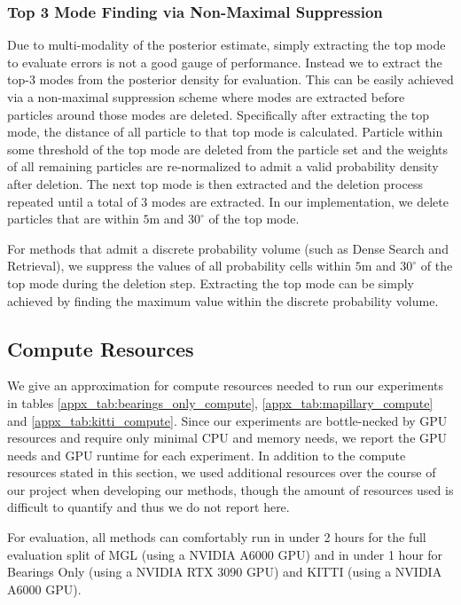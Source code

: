     \subsubsection{Top 3 Mode Finding via Non-Maximal Suppression}
        Due to multi-modality of the posterior estimate, simply extracting the top mode to evaluate errors is not a good gauge of performance.  Instead we  to extract the top-3 modes from the posterior density for evaluation.  This can be easily achieved via a non-maximal suppression scheme where modes are extracted before particles around those modes are deleted.
        Specifically after extracting the top mode, the distance of all particle to that top mode is calculated. Particle within some threshold of the top mode are deleted from the particle set and the weights of all remaining particles are re-normalized to admit a valid probability density after deletion.  The next top mode is then extracted and the deletion process repeated until a total of 3 modes are extracted. In our implementation, we delete particles that are within $5$m and $30^{\circ}$ of the top mode. 
        
        For methods that admit a discrete probability volume (such as Dense Search and Retrieval), we suppress the values of all probability cells  within $5$m and $30^{\circ}$ of the top mode during the deletion step.  Extracting the top mode can be simply achieved by finding the maximum value within the discrete probability volume.



\subsection{Compute Resources}

    We give an approximation for compute resources needed to run our experiments in tables \ref{appx_tab:bearings_only_compute}, \ref{appx_tab:mapillary_compute} and \ref{appx_tab:kitti_compute}. Since our experiments are bottle-necked by GPU resources and require only minimal CPU and memory needs, we report the GPU needs and GPU runtime for each experiment. In addition to the compute resources stated in this section, we used additional resources over the course of our project when developing our methods, though the amount of resources used is difficult to quantify and thus we do not report here. 
    
    For evaluation, all methods can comfortably run in under 2 hours for the full evaluation split of MGL (using a NVIDIA A6000 GPU) and in under 1 hour for Bearings Only (using a NVIDIA RTX 3090 GPU) and KITTI (using a NVIDIA A6000 GPU).
    

